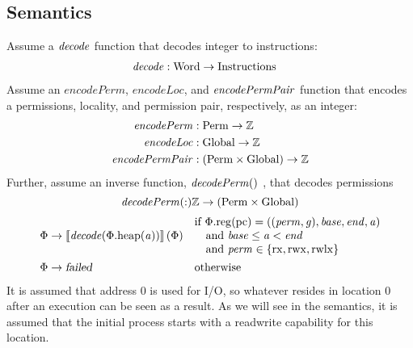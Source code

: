 \documentclass[a4paper]{article}
\newcommand{\sem}[1]{\left\llbracket #1 \right\rrbracket}
\newcommand{\fun}{\rightarrow}
\newcommand{\var}[1]{\mathit{#1}}
\newcommand{\gl}{\var{g}}
\newcommand{\pcreg}{\mathrm{pc}}
\newcommand{\addr}{\var{a}}
\newcommand{\start}{\var{base}}
\newcommand{\addrend}{\var{end}}
\newcommand{\perm}{\var{perm}}
\newcommand{\stdcap}[1][(\perm,\gl)]{\left(#1,\start,\addrend,\addr \right)}
\newcommand{\plainproj}[1]{\mathrm{#1}}
\newcommand{\memheap}[1][\Phi]{#1.\plainproj{heap}}
\newcommand{\memreg}[1][\Phi]{#1.\plainproj{reg}}
\newcommand{\failed}{\textsl{failed}}
\newcommand{\plainfun}[2]{
  \ifthenelse{\equal{#2}{}}
             {\mathit{#1}}
             {\mathit{#1}(#2)}
}
\newcommand{\decode}{\plainfun{decode}{}}
\newcommand{\encodePerm}{\mathit{encodePerm}}
\newcommand{\encodePermPair}{\plainfun{encodePermPair}{}}
\newcommand{\encodeLoc}{\mathit{encodeLoc}{}}
\newcommand{\decodePermPair}{\plainfun{decodePerm}}
\newcommand{\plaindom}[1]{\mathrm{#1}}
\newcommand{\Words}{\plaindom{Word}}
\newcommand{\Instrs}{\plaindom{Instructions}}
\newcommand{\ints}{\mathbb{Z}}
\newcommand{\Perms}{\plaindom{Perm}}
\newcommand{\Globals}{\plaindom{Global}}
\newcommand{\plainperm}[1]{\mathrm{#1}}
\newcommand{\exec}{\plainperm{rx}}
\newcommand{\rwx}{\plainperm{rwx}}
\newcommand{\rwlx}{\plainperm{rwlx}}
\begin{document}
\subsection*{Semantics}
Assume a $\decode$ function that decodes integer to instructions:
\begin{align*}
\decode &:\Words \fun \Instrs
\end{align*}
Assume an $\encodePerm$, $\encodeLoc$, and $\encodePermPair$ function that encodes a permissions, locality, and permission pair, respectively, as an integer:
\begin{align*}
\encodePerm &: \Perms \fun \ints \\
\encodeLoc &: \Globals \fun \ints \\
\encodePermPair &: (\Perms \times \Globals) \fun \ints \\
\end{align*}
Further, assume an inverse function, $\decodePermPair$, that decodes permissions
\[
  \decodePermPair : \ints \fun (\Perms \times \Globals)
\]
\begin{align*}
  \Phi & \rightarrow \sem{\decode(\memheap(\addr))}(\Phi) & &                                   
                                                              \arraycolsep=0pt
                                                              \begin{array}{l}
                                                                \text{if $\memreg(\pcreg) = \stdcap$}\\
                                                                \quad\text{and $\start \leq \addr < \addrend$}\\
                                                                \quad\text{and $\perm \in \{ \exec,\rwx, \rwlx \}$ }
                                                              \end{array}\\
\Phi & \rightarrow \failed                                 & & \text{otherwise}
\end{align*}
It is assumed that address 0 is used for I/O, so whatever resides in location 0 after an execution can be seen as a result. As we will see in the semantics, it is assumed that the initial process starts with a readwrite capability for this location.
\end{document}
